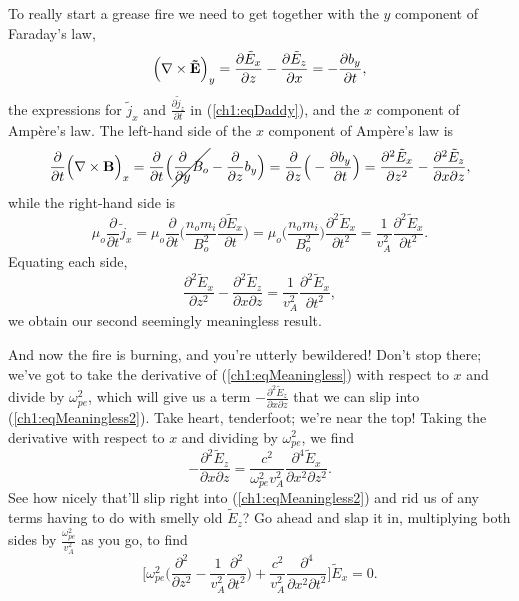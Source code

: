 To really start a grease fire we need to get together with the $y$ component of
Faraday's law,
\begin{equation*}
  \Big ( {\bf \nabla} \times \mathbf{\tilde E} \Big )_y = \dfrac{\partial \tilde E_x}{\partial z} - \dfrac{\partial \tilde E_z}{\partial x} = - \dfrac{\partial b_y}{\partial t},
\end{equation*}
the expressions for $\tilde j_x$ and $\frac{\partial \tilde j_z}{\partial t}$ in
(\ref{ch1:eqDaddy}), and the $x$ component of Amp\`{e}re's law. The left-hand
side of the $x$ component of Amp\`{e}re's law is
\begin{equation*}
  \dfrac{\partial}{\partial t} \Big ( {\bf \nabla} \times \mathbf{B} \Big )_x = \dfrac{\partial}{\partial t} \Big ( \cancel{\dfrac{\partial}{\partial y} B_o} - \dfrac{\partial}{\partial z} b_y \Big ) = \dfrac{\partial}{\partial z} \Big ( - \dfrac{\partial b_y}{\partial t} \Big ) = \dfrac{\partial^2 \tilde E_x}{\partial z^2} - \dfrac{\partial^2 \tilde E_z}{\partial x \partial z},
\end{equation*}
while the right-hand side is 
\begin{equation*}
  \mu_o \dfrac{\partial}{\partial t} \tilde j_x = \mu_o \dfrac{\partial}{\partial t} \Big ( \dfrac{n_o m_i}{B_o^2} \dfrac{\partial \tilde E_x}{\partial t} \Big ) = \mu_o \Big ( \dfrac{n_o m_i}{B_o^2} \Big ) \dfrac{\partial^2 \tilde E_x}{\partial t^2} = \dfrac{1}{v_A^2} \dfrac{\partial^2 \tilde E_x}{\partial t^2}.
\end{equation*}
Equating each side, 
\begin{equation} \label{ch1:eqMeaningless2} \dfrac{\partial^2 \tilde
    E_x}{\partial z^2} - \dfrac{\partial^2 \tilde E_z}{\partial x \partial z} =
  \dfrac{1}{v_A^2} \dfrac{\partial^2 \tilde E_x}{\partial t^2},
\end{equation}
we obtain our second seemingly meaningless result.

And now the fire is burning, and you're utterly bewildered! Don't stop there;
we've got to take the derivative of (\ref{ch1:eqMeaningless}) with respect to
$x$ and divide by $\omega_{pe}^2$, which will give us a term
$-\frac{\partial^2 \tilde E_z}{\partial x \partial z}$ that we can slip into
(\ref{ch1:eqMeaningless2}). Take heart, tenderfoot; we're near the top! Taking
the derivative with respect to $x$ and dividing by $\omega_{pe}^2$, we find
\begin{equation*}
  -\dfrac{\partial^2 \tilde E_z}{\partial x \partial z} = \dfrac{c^2}{\omega_{pe}^2 v_A^2} \dfrac{\partial^4 \tilde E_x}{\partial x^2 \partial z^2}.
\end{equation*}
See how nicely that'll slip right into (\ref{ch1:eqMeaningless2}) and rid us of any terms having to do with smelly old $\tilde E_z$? Go
ahead and slap it in, multiplying both sides by $\frac{\omega_{pe}^2}{v_A^2}$ as you go, to find
\begin{equation} \label{ch1:eqAlmost}
  \Big [ \omega_{pe}^2 \Big ( \dfrac{\partial^2}{\partial z^2} - \dfrac{1}{v_A^2} \dfrac{\partial^2}{\partial t^2} \Big ) + \dfrac{c^2}{v_A^2} \dfrac{\partial^4}{\partial x^2 \partial t^2} \Big ] \tilde E_x = 0.
\end{equation}

